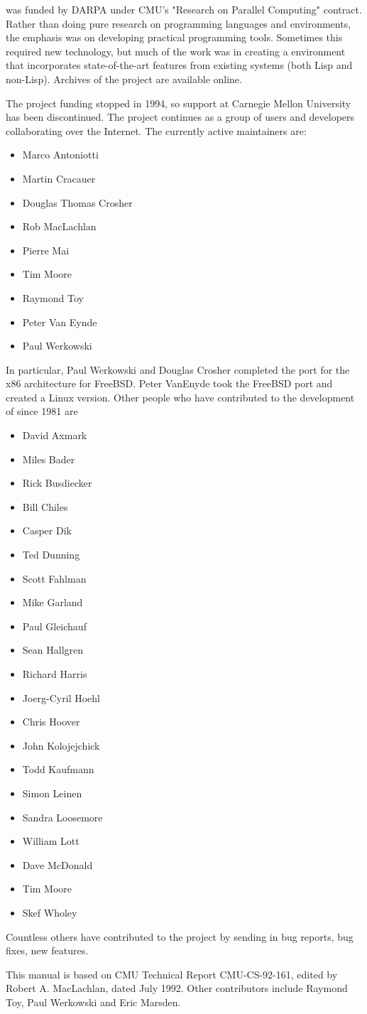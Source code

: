 \cmucl{} was funded by DARPA under CMU's "Research on Parallel Computing"
contract. Rather than doing pure research on programming languages and
environments, the emphasis was on developing practical programming
tools. Sometimes this required new technology, but much of the work
was in creating a \clisp{} environment that incorporates
state-of-the-art features from existing systems (both Lisp and
non-Lisp). Archives of the project are available online.

The project funding stopped in 1994, so support at Carnegie Mellon
University has been discontinued. The project continues as a group of
users and developers collaborating over the Internet. The currently
active maintainers are:

\begin{itemize}
\item Marco Antoniotti
\item Martin Cracauer
\item Douglas Thomas Crosher
\item Rob MacLachlan
\item Pierre Mai
\item Tim Moore  
\item Raymond Toy
\item Peter Van Eynde
\item Paul Werkowski
\end{itemize}

In particular, Paul Werkowski and Douglas Crosher completed the port
for the x86 architecture for FreeBSD. Peter VanEnyde took the FreeBSD
port and created a Linux version. Other people who have contributed to
the development of \cmucl{} since 1981 are

\begin{itemize}
\item David Axmark
\item Miles Bader
\item Rick Busdiecker
\item Bill Chiles
\item Casper Dik
\item Ted Dunning
\item Scott Fahlman
\item Mike Garland
\item Paul Gleichauf
\item Sean Hallgren
\item Richard Harris
\item Joerg-Cyril Hoehl
\item Chris Hoover
\item John Kolojejchick
\item Todd Kaufmann
\item Simon Leinen
\item Sandra Loosemore
\item William Lott
\item Dave McDonald
\item Tim Moore
\item Skef Wholey
\end{itemize}

Countless others have contributed to the project by sending in bug
reports, bug fixes, new features.

This manual is based on CMU Technical Report CMU-CS-92-161, edited by
Robert A. MacLachlan, dated July 1992. Other contributors include
Raymond Toy, Paul Werkowski and Eric Marsden.

